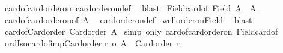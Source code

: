 \begin{isabellebody}
%
\isadelimproof
%
\endisadelimproof
%
\isatagproof
{}\isamarkupfalse%
\ card{\isacharunderscore}{\kern0pt}of{\isacharunderscore}{\kern0pt}card{\isacharunderscore}{\kern0pt}order{\isacharunderscore}{\kern0pt}on\ card{\isacharunderscore}{\kern0pt}order{\isacharunderscore}{\kern0pt}on{\isacharunderscore}{\kern0pt}def\ \isamarkupfalse%
\ blast%
\endisatagproof
{\isafoldproof}%
%
\isadelimproof
\isanewline
%
\endisadelimproof
\isanewline
{}\isamarkupfalse%
\ Field{\isacharunderscore}{\kern0pt}card{\isacharunderscore}{\kern0pt}of{\isacharcolon}{\kern0pt}\ {\isachardoublequoteopen}Field\ {\isacharbar}{\kern0pt}A{\isacharbar}{\kern0pt}\ {\isacharequal}{\kern0pt}\ A{\isachardoublequoteclose}\isanewline
%
\isadelimproof
%
\endisadelimproof
%
\isatagproof
{}\isamarkupfalse%
\ card{\isacharunderscore}{\kern0pt}of{\isacharunderscore}{\kern0pt}card{\isacharunderscore}{\kern0pt}order{\isacharunderscore}{\kern0pt}on{\isacharbrackleft}{\kern0pt}of\ A{\isacharbrackright}{\kern0pt}\ \isamarkupfalse%
\ card{\isacharunderscore}{\kern0pt}order{\isacharunderscore}{\kern0pt}on{\isacharunderscore}{\kern0pt}def\isanewline
{}\isamarkupfalse%
\ well{\isacharunderscore}{\kern0pt}order{\isacharunderscore}{\kern0pt}on{\isacharunderscore}{\kern0pt}Field\ \isamarkupfalse%
\ blast%
\endisatagproof
{\isafoldproof}%
%
\isadelimproof
\isanewline
%
\endisadelimproof
\isanewline
{}\isamarkupfalse%
\ card{\isacharunderscore}{\kern0pt}of{\isacharunderscore}{\kern0pt}Card{\isacharunderscore}{\kern0pt}order{\isacharcolon}{\kern0pt}\ {\isachardoublequoteopen}Card{\isacharunderscore}{\kern0pt}order\ {\isacharbar}{\kern0pt}A{\isacharbar}{\kern0pt}{\isachardoublequoteclose}\isanewline
%
\isadelimproof
%
\endisadelimproof
%
\isatagproof
{}\isamarkupfalse%
\ {\isacharparenleft}{\kern0pt}simp\ only{\isacharcolon}{\kern0pt}\ card{\isacharunderscore}{\kern0pt}of{\isacharunderscore}{\kern0pt}card{\isacharunderscore}{\kern0pt}order{\isacharunderscore}{\kern0pt}on\ Field{\isacharunderscore}{\kern0pt}card{\isacharunderscore}{\kern0pt}of{\isacharparenright}{\kern0pt}%
\endisatagproof
{\isafoldproof}%
%
\isadelimproof
\isanewline
%
\endisadelimproof
\isanewline
{}\isamarkupfalse%
\ ordIso{\isacharunderscore}{\kern0pt}card{\isacharunderscore}{\kern0pt}of{\isacharunderscore}{\kern0pt}imp{\isacharunderscore}{\kern0pt}Card{\isacharunderscore}{\kern0pt}order{\isacharcolon}{\kern0pt}\isanewline
{\isachardoublequoteopen}r\ {\isacharequal}{\kern0pt}o\ {\isacharbar}{\kern0pt}A{\isacharbar}{\kern0pt}\ {\isasymLongrightarrow}\ Card{\isacharunderscore}{\kern0pt}order\ r{\isachardoublequoteclose}\isanewline

\end{isabellebody}
